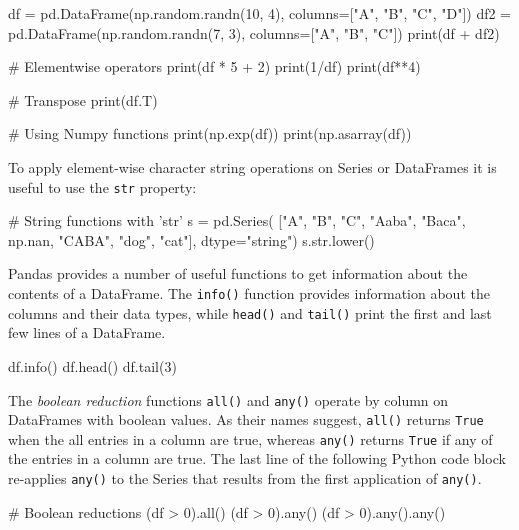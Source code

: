 \begin{samepage}
\begin{pythoncode}
df = pd.DataFrame(np.random.randn(10, 4), 
                  columns=["A", "B", "C", "D"])
df2 = pd.DataFrame(np.random.randn(7, 3), 
                   columns=["A", "B", "C"])
print(df + df2)

# Elementwise operators
print(df * 5 + 2)
print(1/df)
print(df**4)

# Transpose
print(df.T)

# Using Numpy functions
print(np.exp(df))
print(np.asarray(df))
\end{pythoncode}
\end{samepage}

To apply element-wise character string operations on Series or DataFrames it is useful to use the \texttt{str} property:

\begin{samepage}
\begin{pythoncode}
# String functions with 'str'
s = pd.Series(
    ["A", "B", "C", "Aaba", "Baca", np.nan, 
     "CABA", "dog", "cat"], dtype="string")
s.str.lower()
\end{pythoncode}
\end{samepage}

Pandas provides a number of useful functions to get information about the contents of a DataFrame. The \texttt{info()} function provides information about the columns and their data types, while \texttt{head()} and \texttt{tail()} print the first and last few lines of a DataFrame. 

\begin{samepage}
\begin{pythoncode}
df.info()
df.head()
df.tail(3)
\end{pythoncode}
\end{samepage}

The \emph{boolean reduction} functions \texttt{all()} and \texttt{any()} operate by column on DataFrames with boolean values. As their names suggest, \texttt{all()} returns \texttt{True} when the all entries in a column are true, whereas \texttt{any()} returns \texttt{True} if any of the entries in a column are true. The last line of the following Python code block re-applies \texttt{any()} to the Series that results from the first application of \texttt{any()}.

\begin{samepage}
\begin{pythoncode}
# Boolean reductions
(df > 0).all()
(df > 0).any()
(df > 0).any().any()
\end{pythoncode}
\end{samepage}

